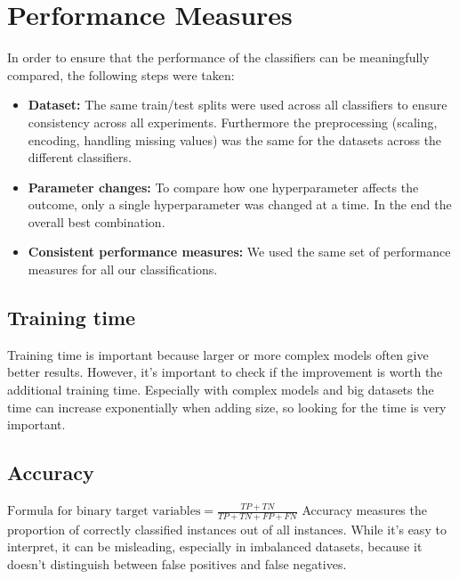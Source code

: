 \documentclass{article}
\begin{document}
\section{Performance Measures}
In order to ensure that the performance of the classifiers can be meaningfully compared, the following steps were taken:
\begin{itemize}
    \item \textbf{Dataset:} The same train/test splits were used across all classifiers to ensure consistency across all experiments. Furthermore the preprocessing (scaling, encoding, handling missing values) was the same for the datasets across the different classifiers.  
    \item \textbf{Parameter changes:} To compare how one hyperparameter affects the outcome, only a single hyperparameter was changed at a time. In the end the overall best combination.
    \item \textbf{Consistent performance measures:} We used the same set of performance measures for all our classifications.
\end{itemize}


\subsection{Training time}
Training time is important because larger or more complex models often give better results. However, it's important to check if the improvement is worth the additional training time. Especially with complex models and big datasets the time can increase exponentially when adding size, so looking for the time is very important.


\subsection{Accuracy}
$\text{Formula for binary target variables} = \frac{TP + TN}{TP + TN + FP + FN}$
Accuracy measures the proportion of correctly classified instances out of all instances. While it’s easy to interpret, it can be misleading, especially in imbalanced datasets, because it doesn't distinguish between false positives and false negatives.
\end{document}
